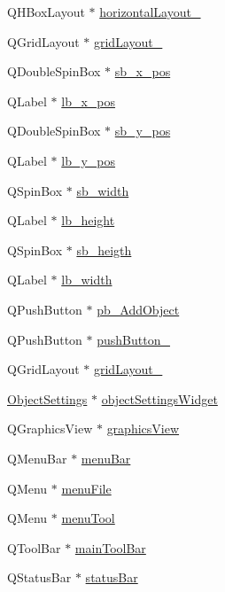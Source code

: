 \begin{DoxyCompactItemize}
\item 
Q\+H\+Box\+Layout $\ast$ \hyperlink{class_ui___main_window_a80867018070156432923d0266cc9fe25}{horizontal\+Layout\+\_}
\item 
Q\+Grid\+Layout $\ast$ \hyperlink{class_ui___main_window_ad113cf7b76aaf178473555bdf64ff035}{grid\+Layout\+\_}
\item 
Q\+Double\+Spin\+Box $\ast$ \hyperlink{class_ui___main_window_a88ab1ae40c18d192579113661acff7e5}{sb\+\_\+x\+\_\+pos}
\item 
Q\+Label $\ast$ \hyperlink{class_ui___main_window_a4595b05b68b1fe0654f49880365f8bbf}{lb\+\_\+x\+\_\+pos}
\item 
Q\+Double\+Spin\+Box $\ast$ \hyperlink{class_ui___main_window_aace1213365524c7c202cb8ed1275d6c9}{sb\+\_\+y\+\_\+pos}
\item 
Q\+Label $\ast$ \hyperlink{class_ui___main_window_a87cfd1f185a4fdeea6cd518fab6d2f10}{lb\+\_\+y\+\_\+pos}
\item 
Q\+Spin\+Box $\ast$ \hyperlink{class_ui___main_window_a24b22ee2a2999c916f1856cdc9b30c1a}{sb\+\_\+width}
\item 
Q\+Label $\ast$ \hyperlink{class_ui___main_window_a61050b9dffa9937b28704c0add9edc92}{lb\+\_\+height}
\item 
Q\+Spin\+Box $\ast$ \hyperlink{class_ui___main_window_a4667610a26642e4588ba8ec79f8854c4}{sb\+\_\+heigth}
\item 
Q\+Label $\ast$ \hyperlink{class_ui___main_window_af1848a715d514f01db491648697a1678}{lb\+\_\+width}
\item 
Q\+Push\+Button $\ast$ \hyperlink{class_ui___main_window_a7943d7d8b767c4c7ceebe8123b31ae7f}{pb\+\_\+\+Add\+Object}
\item 
Q\+Push\+Button $\ast$ \hyperlink{class_ui___main_window_a59a7d8124bce933d63f53f2153d447b4}{push\+Button\+\_}
\item 
Q\+Grid\+Layout $\ast$ \hyperlink{class_ui___main_window_a8731b71c513ff94baf59614807823c5d}{grid\+Layout\+\_}
\item 
\hyperlink{class_object_settings}{Object\+Settings} $\ast$ \hyperlink{class_ui___main_window_ae99e485cd9af336f4b3b73911e44fe2d}{object\+Settings\+Widget}
\item 
Q\+Graphics\+View $\ast$ \hyperlink{class_ui___main_window_a713d8e541d9de8389ad4292131dc931a}{graphics\+View}
\item 
Q\+Menu\+Bar $\ast$ \hyperlink{class_ui___main_window_a2be1c24ec9adfca18e1dcc951931457f}{menu\+Bar}
\item 
Q\+Menu $\ast$ \hyperlink{class_ui___main_window_a7ba84cb4cdd6a12dc83bf4e100bd8d80}{menu\+File}
\item 
Q\+Menu $\ast$ \hyperlink{class_ui___main_window_a2d61dddc70dd5d135cded37470cc8f02}{menu\+Tool}
\item 
Q\+Tool\+Bar $\ast$ \hyperlink{class_ui___main_window_a5172877001c8c7b4e0f6de50421867d1}{main\+Tool\+Bar}
\item 
Q\+Status\+Bar $\ast$ \hyperlink{class_ui___main_window_a50fa481337604bcc8bf68de18ab16ecd}{status\+Bar}
\end{DoxyCompactItemize}


